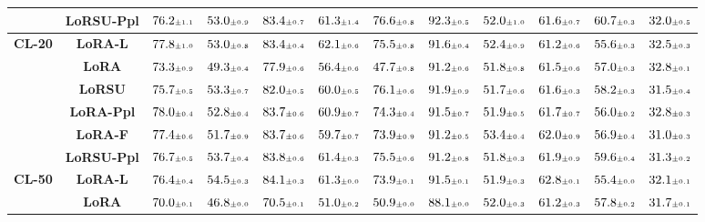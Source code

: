 \begin{table}
\begin{center}
\begin{small}
\begin{tabular}{l c c c c c c c c c c c}
& \textbf{LoRSU-Ppl} & $76.2 \mtiny{\pm 1.1}$ & $53.0 \mtiny{\pm 0.9}$ & $83.4 \mtiny{\pm 0.7}$ & $61.3 \mtiny{\pm 1.4}$ & $76.6 \mtiny{\pm 0.8}$ & $92.3 \mtiny{\pm 0.5}$ & $52.0 \mtiny{\pm 1.0}$ & $61.6 \mtiny{\pm 0.7}$ & $60.7 \mtiny{\pm 0.3}$ & $32.0 \mtiny{\pm 0.5}$ \\
\midrule
\multirow{6}{*}{\textbf{CL-20}} & \textbf{LoRA-L} & $77.8 \mtiny{\pm 1.0}$ & $53.0 \mtiny{\pm 0.8}$ & $83.4 \mtiny{\pm 0.4}$ & $62.1 \mtiny{\pm 0.6}$ & $75.5 \mtiny{\pm 0.8}$ & $91.6 \mtiny{\pm 0.4}$ & $52.4 \mtiny{\pm 0.9}$ & $61.2 \mtiny{\pm 0.6}$ & $55.6 \mtiny{\pm 0.3}$ & $32.5 \mtiny{\pm 0.3}$ \\
& \textbf{LoRA} & $73.3 \mtiny{\pm 0.9}$ & $49.3 \mtiny{\pm 0.4}$ & $77.9 \mtiny{\pm 0.6}$ & $56.4 \mtiny{\pm 0.6}$ & $47.7 \mtiny{\pm 0.8}$ & $91.2 \mtiny{\pm 0.6}$ & $51.8 \mtiny{\pm 0.8}$ & $61.5 \mtiny{\pm 0.6}$ & $57.0 \mtiny{\pm 0.3}$ & $32.8 \mtiny{\pm 0.1}$ \\
& \textbf{LoRSU} & $75.7 \mtiny{\pm 0.5}$ & $53.3 \mtiny{\pm 0.7}$ & $82.0 \mtiny{\pm 0.5}$ & $60.0 \mtiny{\pm 0.5}$ & $76.1 \mtiny{\pm 0.6}$ & $91.9 \mtiny{\pm 0.9}$ & $51.7 \mtiny{\pm 0.6}$ & $61.6 \mtiny{\pm 0.3}$ & $58.2 \mtiny{\pm 0.3}$ & $31.5 \mtiny{\pm 0.4}$ \\
& \textbf{LoRA-Ppl} & $78.0 \mtiny{\pm 0.4}$ & $52.8 \mtiny{\pm 0.4}$ & $83.7 \mtiny{\pm 0.6}$ & $60.9 \mtiny{\pm 0.7}$ & $74.3 \mtiny{\pm 0.4}$ & $91.5 \mtiny{\pm 0.7}$ & $51.9 \mtiny{\pm 0.5}$ & $61.7 \mtiny{\pm 0.7}$ & $56.0 \mtiny{\pm 0.2}$ & $32.8 \mtiny{\pm 0.3}$ \\
& \textbf{LoRA-F} & $77.4 \mtiny{\pm 0.6}$ & $51.7 \mtiny{\pm 0.9}$ & $83.7 \mtiny{\pm 0.6}$ & $59.7 \mtiny{\pm 0.7}$ & $73.9 \mtiny{\pm 0.9}$ & $91.2 \mtiny{\pm 0.5}$ & $53.4 \mtiny{\pm 0.4}$ & $62.0 \mtiny{\pm 0.9}$ & $56.9 \mtiny{\pm 0.4}$ & $31.0 \mtiny{\pm 0.3}$ \\
& \textbf{LoRSU-Ppl} & $76.7 \mtiny{\pm 0.5}$ & $53.7 \mtiny{\pm 0.4}$ & $83.8 \mtiny{\pm 0.6}$ & $61.4 \mtiny{\pm 0.3}$ & $75.5 \mtiny{\pm 0.6}$ & $91.2 \mtiny{\pm 0.8}$ & $51.8 \mtiny{\pm 0.3}$ & $61.9 \mtiny{\pm 0.9}$ & $59.6 \mtiny{\pm 0.4}$ & $31.3 \mtiny{\pm 0.2}$ \\
\midrule
\multirow{6}{*}{\textbf{CL-50}} & \textbf{LoRA-L} & $76.4 \mtiny{\pm 0.4}$ & $54.5 \mtiny{\pm 0.3}$ & $84.1 \mtiny{\pm 0.3}$ & $61.3 \mtiny{\pm 0.0}$ & $73.9 \mtiny{\pm 0.1}$ & $91.5 \mtiny{\pm 0.1}$ & $51.9 \mtiny{\pm 0.3}$ & $62.8 \mtiny{\pm 0.1}$ & $55.4 \mtiny{\pm 0.0}$ & $32.1 \mtiny{\pm 0.1}$ \\
& \textbf{LoRA} & $70.0 \mtiny{\pm 0.1}$ & $46.8 \mtiny{\pm 0.0}$ & $70.5 \mtiny{\pm 0.1}$ & $51.0 \mtiny{\pm 0.2}$ & $50.9 \mtiny{\pm 0.0}$ & $88.1 \mtiny{\pm 0.0}$ & $52.0 \mtiny{\pm 0.3}$ & $61.2 \mtiny{\pm 0.3}$ & $57.8 \mtiny{\pm 0.2}$ & $31.7 \mtiny{\pm 0.1}$ \\

\end{tabular}
\end{small}
\end{center}
\end{table}
